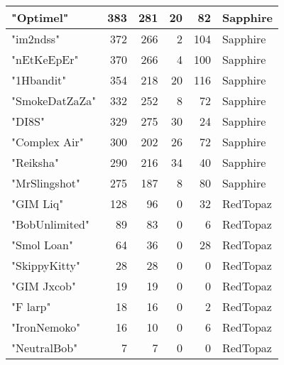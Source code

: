 \documentclass{article}
\begin{document}
\begin{table}[htbp]
\begin{tabular}{|l|r|r|r|r|l|}
"Optimel" & 383 & 281 & 20 & 82 & Sapphire \\ \hline
"im2ndss" & 372 & 266 & 2 & 104 & Sapphire \\ \hline
"nEtKeEpEr" & 370 & 266 & 4 & 100 & Sapphire \\ \hline
"1Hbandit" & 354 & 218 & 20 & 116 & Sapphire \\ \hline
"SmokeDatZaZa" & 332 & 252 & 8 & 72 & Sapphire \\ \hline
"DI8S" & 329 & 275 & 30 & 24 & Sapphire \\ \hline
"Complex Air" & 300 & 202 & 26 & 72 & Sapphire \\ \hline
"Reiksha" & 290 & 216 & 34 & 40 & Sapphire \\ \hline
"MrSlingshot" & 275 & 187 & 8 & 80 & Sapphire \\ \hline
"GIM Liq" & 128 & 96 & 0 & 32 & RedTopaz \\ \hline
"BobUnlimited" & 89 & 83 & 0 & 6 & RedTopaz \\ \hline
"Smol Loan" & 64 & 36 & 0 & 28 & RedTopaz \\ \hline
"SkippyKitty" & 28 & 28 & 0 & 0 & RedTopaz \\ \hline
"GIM Jxcob" & 19 & 19 & 0 & 0 & RedTopaz \\ \hline
"F larp" & 18 & 16 & 0 & 2 & RedTopaz \\ \hline
"IronNemoko" & 16 & 10 & 0 & 6 & RedTopaz \\ \hline
"NeutralBob" & 7 & 7 & 0 & 0 & RedTopaz \\ \hline
\end{tabular}
\end{table}
\end{document}
